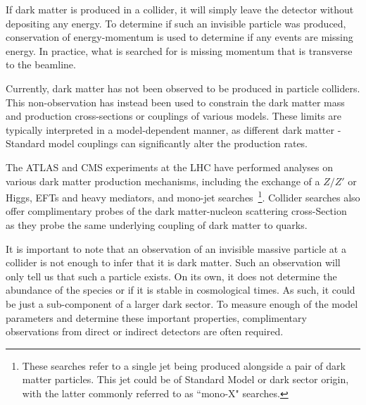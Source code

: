 If dark matter is produced in a collider, it will simply leave the 
detector without depositing any energy. 
To determine if such an invisible particle was produced, 
conservation of energy-momentum is used to determine if 
any events are missing energy. In practice, what 
is searched for is missing momentum that is transverse to the beamline.

Currently, dark matter has not been observed to be produced in particle colliders. This non-observation has instead been used to constrain the dark matter mass and production cross-sections or couplings of various models. 
These limits are typically interpreted in a model-dependent manner, as different dark matter - Standard model couplings can significantly alter the production rates.

 The ATLAS and CMS experiments at the LHC have performed analyses on various dark matter production mechanisms, including the exchange of a $Z/Z'$ or Higgs, EFTs and heavy mediators, and mono-jet searches~\cite{CMS:2017jdm_jul_Searchdarkmatter}\footnote{These searches refer to a single jet being produced alongside a pair of dark matter particles. This jet could be of Standard Model or dark sector origin, with the latter commonly referred to as ``mono-X" searches.}. Collider searches also offer complimentary probes of the dark matter-nucleon scattering cross-Section~\cite{Ruppin:2014bra_oct_Complementaritydarkmatter} as they probe the same underlying coupling of dark matter to quarks.  
 
 It is important to note that an observation of an invisible massive particle at a collider is not enough to infer that it is dark matter. Such an observation will only tell us that such a particle exists. On its own, it does not determine the abundance of the species or if it is stable in cosmological times. As such, it could be just a sub-component of a larger dark sector. To measure enough of the model parameters and determine these important properties, complimentary observations from direct or indirect detectors are often required. 
 
